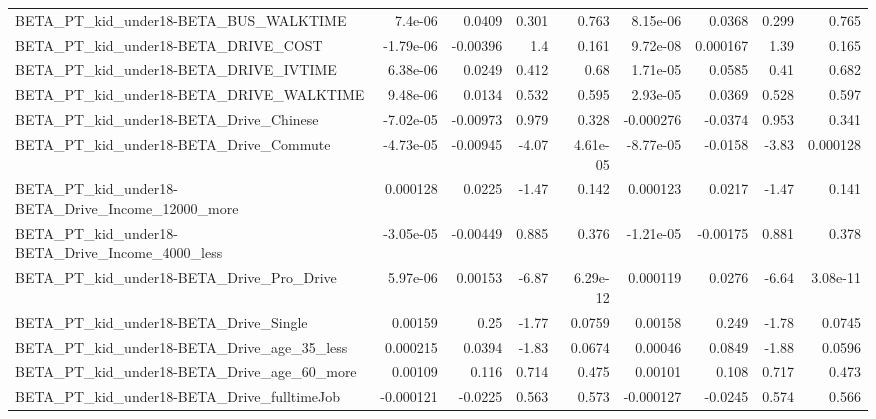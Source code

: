 \begin{tabular}{lrrrrrrrr}
BETA\_PT\_kid\_under18-BETA\_BUS\_WALKTIME              &     7.4e-06 &       0.0409 &     0.301 &    0.763 &   8.15e-06 &      0.0368 &        0.299 &         0.765 \\
BETA\_PT\_kid\_under18-BETA\_DRIVE\_COST                &   -1.79e-06 &     -0.00396 &       1.4 &    0.161 &   9.72e-08 &    0.000167 &         1.39 &         0.165 \\
BETA\_PT\_kid\_under18-BETA\_DRIVE\_IVTIME              &    6.38e-06 &       0.0249 &     0.412 &     0.68 &   1.71e-05 &      0.0585 &         0.41 &         0.682 \\
BETA\_PT\_kid\_under18-BETA\_DRIVE\_WALKTIME            &    9.48e-06 &       0.0134 &     0.532 &    0.595 &   2.93e-05 &      0.0369 &        0.528 &         0.597 \\
BETA\_PT\_kid\_under18-BETA\_Drive\_Chinese             &   -7.02e-05 &     -0.00973 &     0.979 &    0.328 &  -0.000276 &     -0.0374 &        0.953 &         0.341 \\
BETA\_PT\_kid\_under18-BETA\_Drive\_Commute             &   -4.73e-05 &     -0.00945 &     -4.07 & 4.61e-05 &  -8.77e-05 &     -0.0158 &        -3.83 &      0.000128 \\
BETA\_PT\_kid\_under18-BETA\_Drive\_Income\_12000\_more   &    0.000128 &       0.0225 &     -1.47 &    0.142 &   0.000123 &      0.0217 &        -1.47 &         0.141 \\
BETA\_PT\_kid\_under18-BETA\_Drive\_Income\_4000\_less    &   -3.05e-05 &     -0.00449 &     0.885 &    0.376 &  -1.21e-05 &    -0.00175 &        0.881 &         0.378 \\
BETA\_PT\_kid\_under18-BETA\_Drive\_Pro\_Drive           &    5.97e-06 &      0.00153 &     -6.87 & 6.29e-12 &   0.000119 &      0.0276 &        -6.64 &      3.08e-11 \\
BETA\_PT\_kid\_under18-BETA\_Drive\_Single              &     0.00159 &         0.25 &     -1.77 &   0.0759 &    0.00158 &       0.249 &        -1.78 &        0.0745 \\
BETA\_PT\_kid\_under18-BETA\_Drive\_age\_35\_less         &    0.000215 &       0.0394 &     -1.83 &   0.0674 &    0.00046 &      0.0849 &        -1.88 &        0.0596 \\
BETA\_PT\_kid\_under18-BETA\_Drive\_age\_60\_more         &     0.00109 &        0.116 &     0.714 &    0.475 &    0.00101 &       0.108 &        0.717 &         0.473 \\
BETA\_PT\_kid\_under18-BETA\_Drive\_fulltimeJob         &   -0.000121 &      -0.0225 &     0.563 &    0.573 &  -0.000127 &     -0.0245 &        0.574 &         0.566 \\

\end{tabular}
